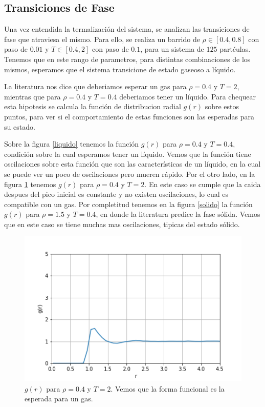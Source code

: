 \documentclass[%
 reprint,
 amsmath,amssymb,
 aps,
]{revtex4-1}
\begin{document}
\subsection{Transiciones de Fase}

Una vez entendida la termalizaci\'on del sistema, se analizan las transiciones
de fase que atraviesa el mismo. Para ello, se realiza un barrido de
$\rho \in [0.4, 0.8]$ con paso de $0.01$ y $T \in [0.4, 2]$ con paso de $0.1$,
para un sistema de $125$ part\'culas. Tenemos que en este rango de parametros,
para distintas combinaciones de los mismos, esperamos que el sistema transicione
de estado gaseoso a l\'iquido.

La literatura nos dice que deberiamos esperar un gas para $\rho = 0.4$ y $T = 2$,
mientras que para $\rho = 0.4$ y $T = 0.4$ deberiamos tener un l\'iquido. Para
chequear esta hipotesis se calcula la funci\'on de distribucion radial $g(r)$
sobre estos puntos, para ver si el comportamiento de estas funciones son las
esperadas para su estado.

Sobre la figura \ref{liquido} tenemos la funci\'on $g(r)$ para $\rho = 0.4$ y
$T = 0.4$, condici\'on sobre la cual esperamos tener un l\'iquido. Vemos que
la funci\'on tiene oscilaciones sobre esta funci\'on que son las
caracter\'isticas de un l\'iquido, en la cual se puede ver un poco de
oscilaciones pero mueren r\'apido. Por el otro lado, en la figura \ref{gas}
tenemos $g(r)$ para $\rho = 0.4$ y $T = 2$. En este caso se cumple que la caida
despues del pico inicial es constante y no existen oscilaciones, lo cual es
compatible con un gas. Por completitud tenemos en la figura \ref{solido} la
funci\'on $g(r)$ para $\rho = 1.5$ y $T = 0.4$, en donde la literatura predice
la fase s\'olida. Vemos que en este caso se tiene muchas mas oscilaciones,
tipicas del estado s\'olido.

\begin{figure}
  \begin{center}
  \includegraphics[scale=0.62]{images/gas.png}
  \caption{$g(r)$ para $\rho = 0.4$ y $T = 2$. Vemos que la forma funcional
  es la esperada para un gas.}
  \label{gas}
\end{center}
\end{figure}
\end{document}
